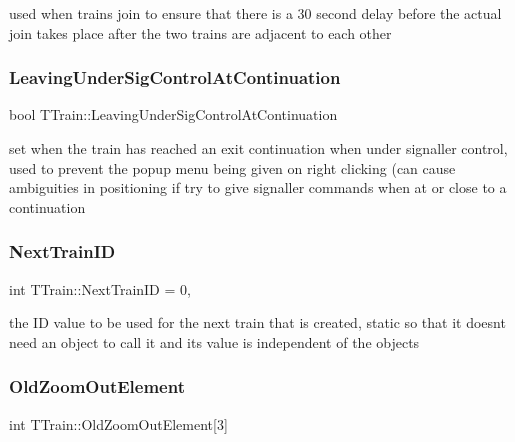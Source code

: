 used when trains join to ensure that there is a 30 second delay before the actual join takes place after the two trains are adjacent to each other \mbox{\label{class_t_train_ac1ce3c1b548c1e4199d211b5fcd9763e}} 
\subsubsection{\texorpdfstring{Leaving\+Under\+Sig\+Control\+At\+Continuation}{LeavingUnderSigControlAtContinuation}}
{\footnotesize\ttfamily bool T\+Train\+::\+Leaving\+Under\+Sig\+Control\+At\+Continuation\hspace{0.3cm}{\ttfamily [private]}}

set when the train has reached an exit continuation when under signaller control, used to prevent the popup menu being given on right clicking (can cause ambiguities in positioning if try to give signaller commands when at or close to a continuation \mbox{\label{class_t_train_a59a6ad055b319a73e954e9bef5f7593c}} 
\subsubsection{\texorpdfstring{Next\+Train\+ID}{NextTrainID}}
{\footnotesize\ttfamily int T\+Train\+::\+Next\+Train\+ID = 0\hspace{0.3cm}{\ttfamily [static]}, {\ttfamily [private]}}

the ID value to be used for the next train that is created, static so that it doesn\textquotesingle{}t need an object to call it and its value is independent of the objects \mbox{\label{class_t_train_a29c7350be73eb11a6c018a4bc8f8099a}} 
\subsubsection{\texorpdfstring{Old\+Zoom\+Out\+Element}{OldZoomOutElement}}
{\footnotesize\ttfamily int T\+Train\+::\+Old\+Zoom\+Out\+Element\mbox{[}3\mbox{]}\hspace{0.3cm}{\ttfamily [private]}}



